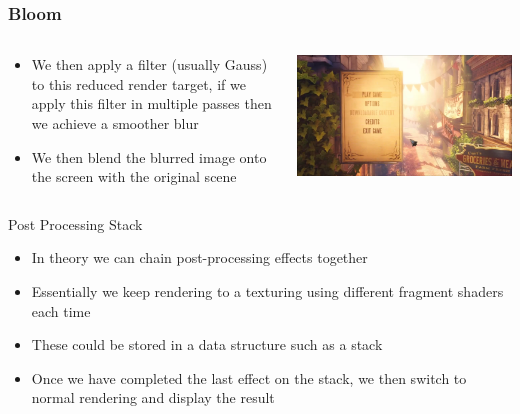 \begin{frame}
	\frametitle{Bloom}
	\begin{columns}
		\begin{column}{0.5\textwidth}
			\begin{itemize}
				\item We then apply a filter (usually Gauss) to this reduced render target, if we apply this filter in multiple passes then we achieve a smoother blur
				\item We then blend the blurred image onto the screen with the original scene 
			\end{itemize}
		\end{column}
		\begin{column}{0.5\textwidth} 
			\begin{center}
				\includegraphics[width=\textwidth]{bloom}
			\end{center}
		\end{column}
	\end{columns}	
\end{frame}

\begin{frame}{Post Processing Stack}
	\begin{itemize}
		\pause\item In theory we can chain post-processing effects together
		\pause\item Essentially we keep rendering to a texturing using different fragment shaders each time
		\pause\item These could be stored in a data structure such as a stack
		\pause\item Once we have completed the last effect on the stack, we then switch to normal rendering and display the result
	\end{itemize}
\end{frame}